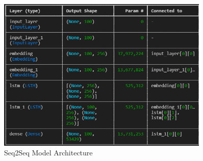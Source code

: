 \documentclass{article}
\begin{document}
\begin{figure}[h]
    \centering
    \includegraphics[width=0.9\textwidth]{model.png}
    \caption{Seq2Seq Model Architecture}
\end{figure}
\end{document}
